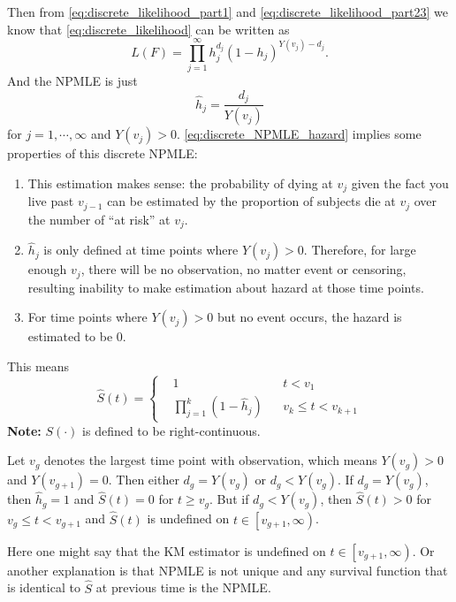 \documentclass[a4paper,12pt]{article}
\begin{document}
\par
Then from \eqref{eq:discrete_likelihood_part1} and \eqref{eq:discrete_likelihood_part23} we know that \eqref{eq:discrete_likelihood} can be written as
\begin{equation}
  \label{eq:discrete_likelihood_rewrite}
  L\left(F\right) = \prod\limits_{j = 1}^{\infty}h_j^{d_j}\left(1 - h_j\right)^{Y\left(v_j\right) - d_j}
  .
\end{equation}
And the NPMLE is just
\begin{equation}
  \label{eq:discrete_NPMLE_hazard}
  \hat{h}_j = \frac{d_j}{Y\left(v_j\right)}
\end{equation}
for $j = 1, \cdots, \infty$ and $Y\left(v_j\right) > 0$. \eqref{eq:discrete_NPMLE_hazard} implies some properties of this discrete NPMLE:
\begin{enumerate}
\item This estimation makes sense: the probability of dying at $v_j$ given the fact you live past $v_{j - 1}$ can be estimated by the proportion of subjects die at $v_j$ over the number of ``at risk'' at $v_j$.
\item $\hat{h}_j$ is only defined at time points where $Y\left(v_j\right) > 0$. Therefore, for large enough $v_j$, there will be no observation, no matter event or censoring, resulting inability to make estimation about hazard at those time points.
\item For time points where $Y\left(v_j\right) >0$ but no event occurs, the hazard is estimated to be 0.
\end{enumerate}
This means
\[
  \hat{S}\left(t\right) =\left\{
  \begin{aligned}    
    & 1 && t < v_1    \\
    & \prod\limits_{j = 1}^{k}\left(1 - \hat{h}_j\right) && v_{k} \leq t < v_{k + 1}
  \end{aligned}
  \right.
\]
\textbf{Note: } $S\left(\cdot\right)$ is defined to be {\color{red} right-continuous}.
\par
Let $v_g$ denotes the largest time point with observation, which means $Y\left(v_g\right) > 0$ and $Y\left(v_{g+ 1}\right) = 0$. Then either $d_g = Y\left(v_g\right)$ or $d_g < Y\left(v_g\right)$. If $d_g = Y\left(v_g\right)$, then $\hat{h}_g = 1$ and $\hat{S}\left(t\right) = 0$ for $t \geq v_g$. But if $d_g < Y\left(v_g\right)$, then $\hat{S}\left(t\right) > 0$ for $v_g \leq t < v_{g+1}$ and $\hat{S}\left(t\right)$ is undefined on $t\in\left[v_{g + 1}, \infty\right)$.
\par
Here one might say that the KM estimator is undefined on $t\in\left[v_{g+ 1}, \infty\right)$. Or another explanation is that NPMLE is not unique and any survival function that is identical to $\hat{S}$ at previous time is the NPMLE.
\end{document}
